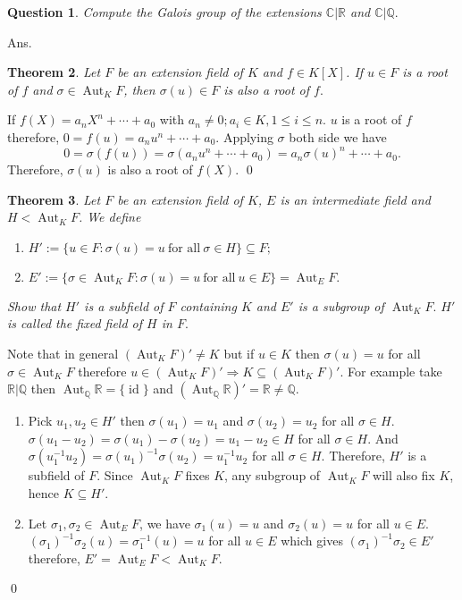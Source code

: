 \documentclass[11pt]{amsart}
\newtheorem{theorem}{Theorem}[section]
\newtheorem{qns}[theorem]{Question}
\newcommand{\QQ}{\mathbb Q}
\newcommand{\CC}{\mathbb C}
\newcommand{\RR}{\mathbb R}
\DeclareMathOperator{\aut}{\text{Aut}}
\DeclareMathOperator{\id}{\text{id}}
\begin{document}
\begin{qns}
Compute the Galois group of the extensions ${\CC}|{\RR}$ and ${\CC}|{\QQ}.$
\end{qns}
Ans.\\
\begin{theorem}
Let $F$ be an extension field of $K$ and $f\in K[X]$. If $u\in F$ is a root of $f$ and $\sigma\in \aut_KF$, then $\sigma(u)\in F$ is also a root of $f.$
\end{theorem}
\proof If $f(X)=a_nX^n+\cdots+a_0$ with $a_n\neq 0;a_i\in K,1\leq i\leq n.$ $u$ is a root of $f$ therefore, $0=f(u)=a_nu^n+\cdots+a_0$. Applying $\sigma$ both side we have $$0=\sigma(f(u))=\sigma(a_nu^n+\cdots+a_0)=a_n\sigma(u)^n+\cdots+a_0.$$ Therefore, $\sigma(u)$ is also a root of $f(X).$ \qed
\begin{theorem}
Let $F$ be an extension field of $K$, $E$ is an intermediate field and $H<\aut_KF$. We define \begin{enumerate}
\item $H':=\{u\in F:\sigma(u)=u~\text{for all}~\sigma\in H\}\subseteq F;$
\item $E':=\{\sigma\in \aut_KF:\sigma(u)=u~\text{for all}~u\in E\}=\aut_E F.$ 
\end{enumerate}
Show that $H'$ is a subfield of $F$ containing $K$ and $E'$ is a subgroup of $\aut_KF.$ $H'$ is called the fixed field of $H$ in $F.$
\begin{center}
\end{center}
\end{theorem}
Note that in general $(\aut_KF)'\neq K$ but if $u\in K$ then $\sigma(u)=u$ for all $\sigma\in\aut_KF$ therefore $u\in (\aut_KF)' \Rightarrow K\subseteq (\aut_KF)'.$ For example take ${\RR}|{\QQ}$ then $\aut_{\QQ}{\RR}=\{\id\}$ and $(\aut_{\QQ}{\RR})'={\RR}\neq {\QQ}.$
\proof \begin{enumerate}
\item Pick $u_1,u_2\in H'$ then $\sigma(u_1)=u_1$ and $\sigma(u_2)=u_2$ for all $\sigma\in H.$ $\sigma(u_1-u_2)=\sigma(u_1)-\sigma(u_2)=u_1-u_2\in H$ for all $\sigma\in H.$ And $\sigma(u_1^{-1}u_2)=\sigma(u_1)^{-1}\sigma(u_2)=u_1^{-1}u_2$ for all $\sigma\in H$. Therefore, $H'$ is a subfield of $F.$ Since $\aut_KF$ fixes $K$, any subgroup of $\aut_KF$ will also fix $K$, hence $K\subseteq H'.$
\item Let $\sigma_1,\sigma_2\in \aut_EF$, we have $\sigma_1(u)=u$ and $\sigma_2(u)=u$ for all $u\in E.$ $(\sigma_1)^{-1}\sigma_2(u)=\sigma_1^{-1}(u)=u$ for all $u\in E$ which gives $(\sigma_1)^{-1}\sigma_2\in E'$ therefore, $E'=\aut_EF<\aut_KF.$
\end{enumerate}
\qed
\end{document}
